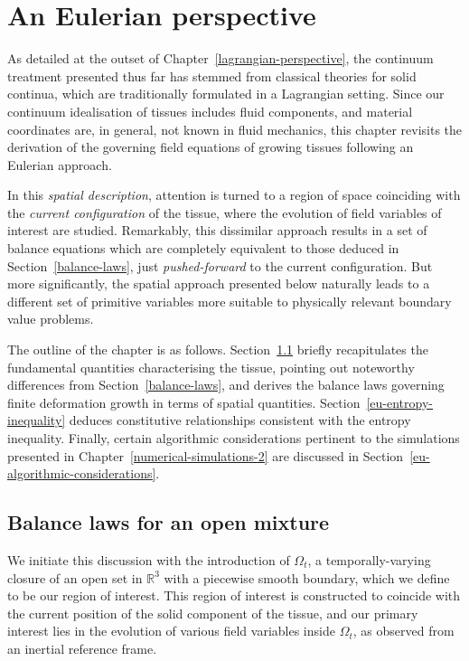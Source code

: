 \chapter{An Eulerian perspective}
\label{eulerian-perspective}

As detailed at the outset of Chapter~\ref{lagrangian-perspective}, the
continuum treatment presented thus far has stemmed from classical
theories for solid continua, which are traditionally formulated in a
Lagrangian setting. Since our continuum idealisation of tissues
includes fluid components, and material coordinates are, in general,
not known in fluid mechanics, this chapter revisits the derivation of
the governing field equations of growing tissues following an Eulerian
approach.

In this {\em spatial description}, attention is turned to a region of
space coinciding with the {\em current configuration} of the tissue,
where the evolution of field variables of interest are
studied. Remarkably, this dissimilar approach results in a set of
balance equations which are completely equivalent to those deduced in
Section~\ref{balance-laws}, just {\em pushed-forward} to the current
configuration. But more significantly, the spatial approach presented
below naturally leads to a different set of primitive variables more
suitable to physically relevant boundary value problems.

The outline of the chapter is as
follows. Section~\ref{eu-balance-laws} briefly recapitulates the
fundamental quantities characterising the tissue, pointing out
noteworthy differences from Section~\ref{balance-laws}, and derives
the balance laws governing finite deformation growth in terms of
spatial quantities. Section~\ref{eu-entropy-inequality} deduces
constitutive relationships consistent with the entropy
inequality. Finally, certain algorithmic considerations pertinent to
the simulations presented in Chapter~\ref{numerical-simulations-2} are
discussed in Section~\ref{eu-algorithmic-considerations}.

\section{Balance laws for an open mixture}
\label{eu-balance-laws}

We initiate this discussion with the introduction of $\Omega_{t}$, a
temporally-varying closure of an open set in $\mathbb{R}^{3}$ with a
piecewise smooth boundary, which we define to be our region of
interest. This region of interest is constructed to coincide with the
current position of the solid component of the tissue, and our primary
interest lies in the evolution of various field variables inside
$\Omega_{t}$, as observed from an inertial reference frame.

